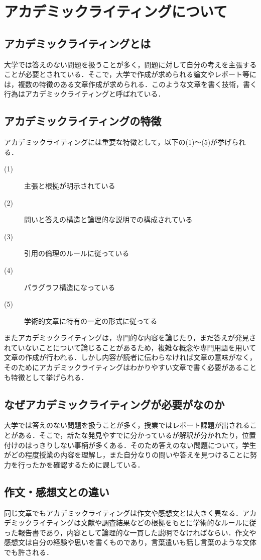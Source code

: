 \documentclass[a4j,12pt]{jarticle}
\begin{document}
\section{アカデミックライティングについて}
\subsection{アカデミックライティングとは}
大学では答えのない問題を扱うことが多く，問題に対して自分の考えを主張することが必要とされている．そこで，大学で作成が求められる論文やレポート等には，複数の特徴のある文章作成が求められる．このような文章を書く技術，書く行為はアカデミックライティングと呼ばれている\cite{ren2}．
\subsection{アカデミックライティングの特徴}
アカデミックライティングには重要な特徴として，以下の(1)〜(5)が挙げられる．
\begin{description}
  \item[(1)] 主張と根拠が明示されている
  \item[(2)] 問いと答えの構造と論理的な説明での構成されている
  \item[(3)] 引用の倫理のルールに従っている
  \item[(4)] パラグラフ構造になっている
  \item[(5)] 学術的文章に特有の一定の形式に従ってる
 \end{description}
 
 またアカデミックライティングは，専門的な内容を論じたり，まだ答えが発見されていないことについて論じることがあるため，複雑な概念や専門用語を用いて文章の作成が行われる．しかし内容が読者に伝わらなければ文章の意味がなく，そのためにアカデミックライティングはわかりやすい文章で書く必要があることも特徴として挙げられる\cite{ren7}．
 
\newpage
\subsection{なぜアカデミックライティングが必要がなのか}
大学では答えのない問題を扱うことが多く，授業ではレポート課題が出されることがある．そこで，新たな発見やすでに分かっているが解釈が分かれたり，位置付けのはっきりしない事柄が多くある．そのため答えのない問題について，学生がどの程度授業の内容を理解し，また自分なりの問いや答えを見つけることに努力を行ったかを確認するために課している．

\subsection{作文・感想文との違い}
同じ文章でもアカデミックライティングは作文や感想文とは大きく異なる．アカデミックライティングは文献や調査結果などの根拠をもとに学術的なルールに従った報告書であり，内容として論理的な一貫した説明でなければならい．作文や感想文は自分の経験や思いを書くものであり，言葉遣いも話し言葉のような文体でも許される．
\end{document}
